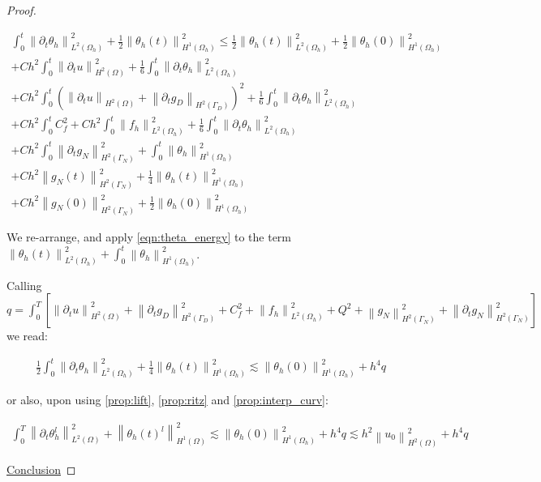 \documentclass[english,a4paper,9pt,oneside]{scrbook}	%
\theoremstyle{break}
\newenvironment{mproof}[1][\proofname]{%
  \begin{proof}[#1]$ $\par\nobreak\ignorespaces
}{%
  \end{proof}
}
\renewcommand*{\proofname}{Proof}
\theoremstyle{remark}
\newcommand{\ds}{\displaystyle}
\newcommand{\norm}[1]{\left\lVert#1\right\rVert}
\begin{document}
\begin{appendices}
\begin{mproof}
\begin{align*}
\int_0^t\norm{\partial_t \theta_h}^2_{L^2(\Omega_h)} + \frac{1}{2} \norm{\theta_h(t)}_{H^1(\Omega_h)}^2 \leq  \frac{1}{2} \norm{\theta_h(t)}_{L^2(\Omega_h)}^2 + \frac{1}{2} \norm{\theta_h(0)}_{H^1(\Omega_h)}^2\\
+ Ch^2\int_0^t \norm{\partial_t u}_{H^2(\Omega)}^2 + \frac{1}{6}\int_0^t\norm{\partial_t \theta_h}^2_{L^2(\Omega_h)}\\
+ Ch^2\int_0^t(\norm{\partial_t u}_{H^2(\Omega)}+	\norm{\partial_t g_D}_{H^2(\Gamma_D)})^2 + \frac{1}{6} \int_0^t\norm{\partial_t \theta_h}_{L^2(\Omega_h)}^2\\
+ Ch^2\int_0^t C_f^2+ Ch^2\int_0^t \norm{f_h}_{L^2(\Omega_h)}^2  + \frac{1}{6}\int_0^t\norm{\partial_t \theta_h}^2_{L^2(\Omega_h)}\\ 
+ Ch^2\int_0^t \norm{\partial_t g_N}_{H^2(\Gamma_N)}^2 + \int_0^t \norm{ \theta_h}_{H^1(\Omega_h)}^2\\
+ Ch^2\norm{g_N(t)}_{H^2(\Gamma_N)}^2 + \frac{1}{4}\norm{ \theta_h(t)}_{H^1(\Omega_h)}^2\\
+ Ch^2\norm{g_N(0)}_{H^2(\Gamma_N)}^2 + \frac{1}{2}\norm{ \theta_h(0)}_{H^1(\Omega_h)}^2
\end{align*}

We re-arrange, and apply \cref{eqn:theta_energy} to the term $\ds \norm{ \theta_h(t)}^2_{L^2(\Omega_h)} + \int_0^t \norm{ \theta_h}_{H^1(\Omega_h)}^2$. 

Calling $q=\ds \int_0^T \left [ \norm{\partial_t u}_{H^2(\Omega)}^2 +	\norm{\partial_t g_D}_{H^2(\Gamma_D)}^2 + C_f^2 +  \norm{f_h}_{L^2(\Omega_h)}^2 + Q^2+ \norm{g_N}_{H^2(\Gamma_N)}^2 + \norm{\partial_t g_N}_{H^2(\Gamma_N)}^2 \right ] $ we read:


\begin{align*}
\frac{1}{2}\int_0^t\norm{\partial_t \theta_h}^2_{L^2(\Omega_h)} + \frac{1}{4} \norm{\theta_h(t)}_{H^1(\Omega_h)}^2 \lesssim  \norm{\theta_h(0)}_{H^1(\Omega_h)}^2+ h^4q
\end{align*}

or also, upon using \cref{prop:lift}, \cref{prop:ritz} and \cref{prop:interp_curv}:

\begin{align*}
\int_0^T\norm{\partial_t \theta_h^l}^2_{L^2(\Omega)} + \norm{\theta_h(t)^l}_{H^1(\Omega)}^2 \lesssim  \norm{\theta_h(0)}_{H^1(\Omega_h)}^2+ h^4q \lesssim h^2\norm{u_0}_{H^2(\Omega)}^2+ h^4q
\end{align*}

\underline{Conclusion}


\end{mproof}
\end{appendices}
\end{document}
